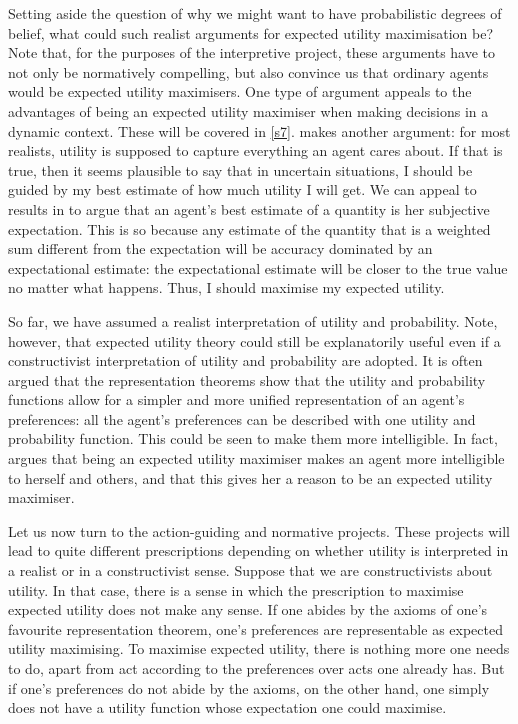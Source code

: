 Setting aside the question of why we might want to have probabilistic degrees of belief, what could such realist arguments for expected utility maximisation be? Note that, for the purposes of the interpretive project, these arguments have to not only be normatively compelling, but also convince us that ordinary agents would be expected utility maximisers. One type of argument appeals to the advantages of being an expected utility maximiser when making decisions in a dynamic context. These will be covered in \autoref{s7}. \citet{Pettigrew2014} makes another argument: for most realists, utility is supposed to capture everything an agent cares about. If that is true, then it seems plausible to say that in uncertain situations, I should be guided by my best estimate of how much utility I will get. We can appeal to results in \citet{deFinetti1974} to argue that an agent's best estimate of a quantity is her subjective expectation. This is so because any estimate of the quantity that is a weighted sum different from the expectation will be accuracy dominated by an expectational estimate: the expectational estimate will be closer to the true value no matter what happens. Thus, I should maximise my expected utility.

So far, we have assumed a realist interpretation of utility and probability. Note, however, that expected utility theory could still be explanatorily useful even if a constructivist interpretation of utility and probability are adopted. It is often argued that the representation theorems show that the utility and probability functions allow for a simpler and more unified representation of an agent's preferences: all the agent's preferences can be described with one utility and probability function. This could be seen to make them more intelligible. In fact, \citet{Velleman1993} argues that being an expected utility maximiser makes an agent more intelligible to herself and others, and that this gives her a reason to be an expected utility maximiser.

Let us now turn to the action-guiding and normative projects. These projects will lead to quite different prescriptions depending on whether utility is interpreted in a realist or in a constructivist sense. Suppose that we are constructivists about utility. In that case, there is a sense in which the prescription to maximise expected utility does not make any sense. If one abides by the axioms of one's favourite representation theorem, one's preferences are representable as expected utility maximising. To maximise expected utility, there is nothing more one needs to do, apart from act according to the preferences over acts one already has.  But if one's preferences do not abide by the axioms, on the other hand, one simply does not have a utility function whose expectation one could maximise.

